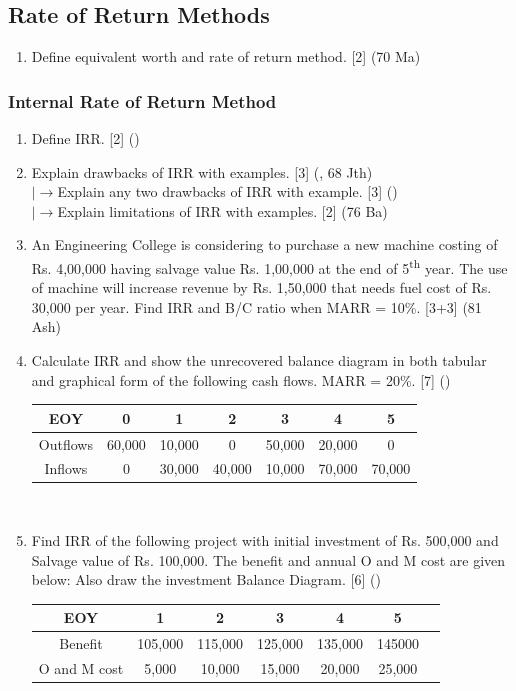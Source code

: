 \documentclass[12pt]{article}
\newcommand{\rb}{\\ $\left|\rightarrow\right.$}
\newcommand{\super}[1]{\textsuperscript{#1}}
\begin{document}
\subsection{Rate of Return Methods}
\begin{enumerate} [noitemsep, topsep = 0pt]
	\item Define equivalent worth and rate of return method. \hfill [2] (70 Ma)
\end{enumerate}
\subsubsection{Internal Rate of Return Method}
\begin{enumerate}[noitemsep, topsep = 0pt]
	\item Define IRR. \hfill [2] ()
	
	\item Explain drawbacks of IRR with examples. \hfill [3] (, 68 Jth)
	\rb  Explain any two drawbacks of IRR with example. \hfill [3] ()
	\rb  Explain limitations of IRR with examples. \hfill [2] (76 Ba)	
	
	\item An Engineering College is considering to purchase a new machine costing of Rs. 4,00,000 having salvage value Rs. 1,00,000 at the end of 5\super{th} year. The use of machine will increase revenue by Rs. 1,50,000 that needs fuel cost of Rs. 30,000 per year. Find IRR and B/C ratio when MARR = 10\%. \hfill [3+3] (81 Ash)
	
	\item Calculate IRR and show the unrecovered balance diagram in both tabular and graphical form of the following cash flows. MARR = 20\%. \hfill [7] ()
	\begin{tabular}{|c|c|c|c|c|c|c|}
		\hline
		EOY & 0 & 1 & 2 & 3 & 4 & 5\\ \hline
		Outflows & 60,000 & 10,000 & 0 & 50,000 & 20,000 & 0\\ \hline
		Inflows & 0 & 30,000 & 40,000 & 10,000 & 70,000 & 70,000\\ \hline
	\end{tabular}\\[1pt]
	
	\item Find IRR of the following project with initial investment of Rs. 500,000 and Salvage value of Rs. 100,000. The benefit and annual O and M cost are given below: Also draw the investment Balance Diagram. \hfill [6] ()\\
	\begin{tabular}{|c|c|c|c|c|c|c|}
		\hline
		EOY & 1 & 2 & 3 & 4 & 5\\ \hline
		Benefit & 105,000 & 115,000 & 125,000 & 135,000 & 145000 \\ \hline
		O and M cost & 5,000 & 10,000 & 15,000 & 20,000 & 25,000 \\ \hline
	\end{tabular}\\[1pt]
	

\end{enumerate}
\end{document}
